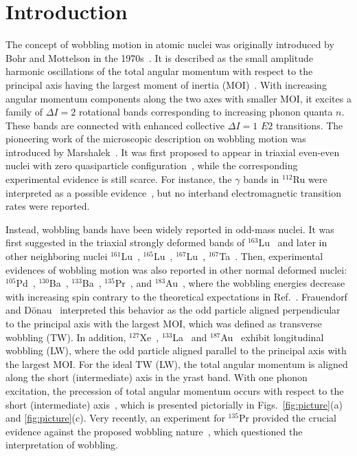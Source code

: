 \documentclass[aps,prc,preprint,showpacs,groupedaddress,floatfix,amsmath,amssymb]{revtex4-1}
\begin{document}
\section{Introduction}

The concept of wobbling motion in atomic nuclei was originally
introduced by Bohr and Mottelson in the 1970s~\cite{Bohr75}. It is described as the small amplitude harmonic oscillations of the total angular
momentum with respect to the principal axis having the
largest moment of inertia (MOI)~\cite{Bohr75}. With increasing angular momentum components along the two axes with smaller MOI, it
excites a family of $\Delta I=2$ rotational bands corresponding to increasing phonon quanta $n$.
These bands are connected with enhanced collective $\Delta I=1$ $E2$ transitions. The pioneering work of  the
microscopic description on wobbling motion  was introduced by Marshalek~\cite{Marshalek79}.
It was first proposed to appear in triaxial even-even nuclei with
zero quasiparticle configuration~\cite{Bohr75}, while the corresponding experimental evidence is still scarce.
For instance, the $\gamma$ bands in $^{112}$Ru were interpreted as a possible evidence~\cite{Ru112}, but no interband electromagnetic transition rates were reported.


Instead, wobbling bands have been widely reported in odd-mass nuclei.
It was first suggested in the triaxial strongly deformed bands of $^{163}$Lu~\cite{Lu1631,Lu1632}
and later in other neighboring nuclei $^{161}$Lu~\cite{Lu161}, $^{165}$Lu~\cite{Lu165}, $^{167}$Lu~\cite{Lu167}, $^{167}$Ta~\cite{Ta167}.
Then, experimental evidences of wobbling motion was also reported in other normal deformed nuclei: $^{105}$Pd~\cite{Pd105}, $^{130}$Ba~\cite{Ba130,Ba1302}, $^{133}$Ba~\cite{Ba133}, $^{135}$Pr~\cite{Pr135,Pr1352}, and $^{183}$Au~\cite{Au183}, where the wobbling energies decrease with increasing spin contrary to the theoretical expectations in Ref.~\cite{Bohr75}. Frauendorf and D\"{o}nau~\cite{Frauendorf14} interpreted this behavior as the odd particle aligned perpendicular to the principal axis with the
largest MOI, which  was defined as transverse wobbling (TW). In addition,
$^{127}$Xe~\cite{Xe127}, $^{133}$La~\cite{La133} and $^{187}$Au~\cite{Au187} exhibit longitudinal wobbling (LW), where the odd particle aligned parallel to the principal axis with the
largest MOI. For the ideal TW (LW), the total angular momentum is aligned along the short (intermediate) axis in the yrast band. With one phonon excitation, the precession of total angular momentum occurs with respect to the short (intermediate) axis~\cite{Frauendorf14,Au187}, which is presented
pictorially in Figs.~\ref{fig:picture}(a) and \ref{fig:picture}(c). Very recently, an experiment for $^{135}$Pr provided the crucial evidence against the proposed wobbling nature~\cite{Pr135tilted}, which questioned the interpretation of wobbling.
\end{document}
